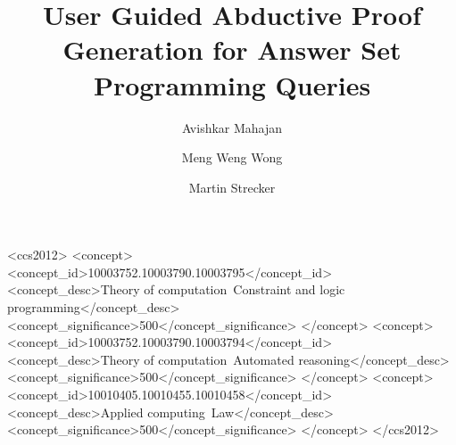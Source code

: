 \documentclass[sigconf]{acmart}
\begin{document}
\title{User Guided Abductive Proof Generation for Answer Set Programming
  Queries}

\author{Avishkar Mahajan}
\author{Meng Weng Wong}

\author{Martin Strecker}



\begin{CCSXML}
<ccs2012>
   <concept>
       <concept_id>10003752.10003790.10003795</concept_id>
       <concept_desc>Theory of computation~Constraint and logic programming</concept_desc>
       <concept_significance>500</concept_significance>
       </concept>
   <concept>
       <concept_id>10003752.10003790.10003794</concept_id>
       <concept_desc>Theory of computation~Automated reasoning</concept_desc>
       <concept_significance>500</concept_significance>
       </concept>
   <concept>
       <concept_id>10010405.10010455.10010458</concept_id>
       <concept_desc>Applied computing~Law</concept_desc>
       <concept_significance>500</concept_significance>
       </concept>
 </ccs2012>
\end{CCSXML}


\maketitle




















\appendix


%


\end{document}
